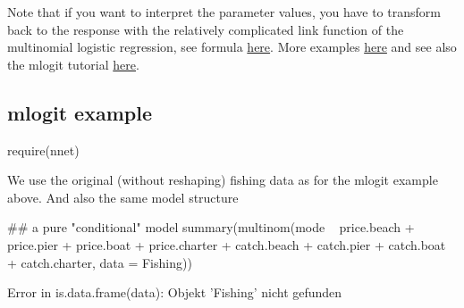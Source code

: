 \documentclass[a4paper,twoside]{tufte-book}\usepackage[]{graphicx}\usepackage[]{color}
\begin{document}
\begin{appendices}
Note that if you want to interpret the parameter values, you have to transform back to the response with the relatively complicated link function of the multinomial logistic regression, see formula \href{http://en.wikipedia.org/wiki/Multinomial_logistic_regression}{here}. More examples \href{http://www.inside-r.org/packages/cran/mlogit/docs/suml}{here} and see also the mlogit tutorial \href{http://cran.r-project.org/web/packages/mlogit/vignettes/Exercises.pdf}{here}.

\subsection{mlogit example}

\begin{Schunk}
\begin{Sinput}
require(nnet)
\end{Sinput}
\end{Schunk}

We use the original (without reshaping) fishing data as for the mlogit example above. 
And also the same model structure

\begin{Schunk}
\begin{Sinput}
## a pure "conditional" model
summary(multinom(mode ~ price.beach + price.pier + price.boat + price.charter + 
                   catch.beach + catch.pier + catch.boat + catch.charter, data = Fishing))
\end{Sinput}
\begin{Soutput}
Error in is.data.frame(data): Objekt 'Fishing' nicht gefunden
\end{Soutput}
\end{Schunk}
\end{appendices}


 
\end{document}
